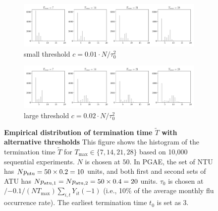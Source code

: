     \begin{figure}[h!]
    \centering
    \begin{subfigure}{1\textwidth}
		\centering
		\includegraphics[width=1\linewidth]{plots/empirical/flu/adaptive/flu_termination_time-10.pdf}
		\caption{small threshold $c = 0.01 \cdot N/\tau_0^2$}
	\end{subfigure}
	\begin{subfigure}{1\textwidth}
		\centering
		\includegraphics[width=1\linewidth]{plots/empirical/flu/adaptive/flu_termination_time-20.pdf}
		\caption{large threshold $c = 0.02 \cdot N/\tau_0^2$}
	\end{subfigure}
	\smallskip
	\caption{\textbf{Empirical distribution of termination time $\tilde{T}$ with alternative thresholds} This figure shows the histogram of the termination time $\tilde{T}$ for $T_{\max} \in \{7,14,21,28\}$ based on 10,000 sequential experiments. $N$ is chosen at $50$. In PGAE, the set of NTU has $N p_{\mathrm{ntu}} = 50 \times 0.2 = 10$ units, and both first and second sets of ATU has $N p_{\mathrm{atu},1} =N p_{\mathrm{atu},2} =  50 \times 0.4 = 20$ units.  $\tau_0$ is chosen at $/{-0.1}/{(NT_{\max})} \sum_{i,t} Y_{it}(-1)$ (i.e., 10\% of the average monthly flu occurrence rate). The earliest termination time $t_0$ is set as $3$. 
	}
	\label{fig:experiment-termination-time-supp}
\end{figure}


